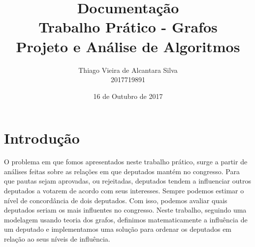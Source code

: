 \documentclass[10pt]{article}
\title{\textbf{Documentação\\Trabalho Prático - Grafos}\\Projeto e Análise de Algoritmos}
\author{Thiago Vieira de Alcantara Silva\\2017719891}
\date{16 de Outubro de 2017}
\begin{document}
\renewcommand\refname{Referências}



\maketitle

\section{Introdução}

O problema em que fomos apresentados neste trabalho prático, surge a partir de análises feitas sobre as relações em que deputados mantém no congresso.
Para que pautas sejam aprovadas, ou rejeitadas, deputados tendem a influenciar outros deputados a votarem de acordo com seus interesses.
Sempre podemos estimar o nível de concordância de dois deputados. Com isso, podemos avaliar quais deputados seriam os mais influentes no congresso.
Neste trabalho, seguindo uma modelagem usando teoria dos grafos, definimos matematicamente a influência de um deputado e implementamos uma solução para ordenar os deputados em relação ao seus níveis de influência.
\end{document}
